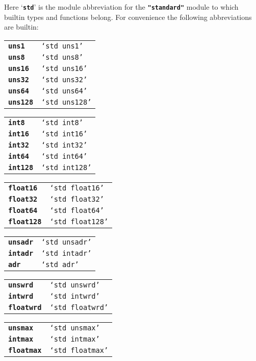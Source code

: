 \documentclass[12pt]{article}
\makeatletter
\newcommand{\TT}[1]{{\tt \bfseries #1}}
\newcommand{\ttkey}[1]{\TT{#1}\index{#1@{\tt #1}}}
\newcommand{\ABV}{-{}-{}->}		%
\newenvironment{indpar}[1][0.3in]%
	{\begin{list}{}%
		     {\setlength{\itemsep}{0in}%
		      \setlength{\topsep}{0in}%
		      \setlength{\parsep}{1ex}%
		      \setlength{\labelwidth}{#1}%
		      \setlength{\leftmargin}{#1}%
		      \addtolength{\leftmargin}{\labelsep}}%
	 \item}%
	{\end{list}}
\makeatother
\begin{document}
Here `\TT{std}' is the module abbreviation for the \TT{"standard"}
module to which builtin types and functions belong.  For convenience
the following abbreviations are builtin:
\begin{indpar}
\begin{tabular}{p{0.8in}@{\tt ~\ABV~}l}
\ttkey{uns1} & {\tt `std~uns1'} \\
\ttkey{uns8} & {\tt `std~uns8'} \\
\ttkey{uns16} & {\tt `std~uns16'} \\
\ttkey{uns32} & {\tt `std~uns32'} \\
\ttkey{uns64} & {\tt `std~uns64'} \\
\ttkey{uns128} & {\tt `std~uns128'} \\
\end{tabular}

\begin{tabular}{p{0.8in}@{\tt ~\ABV~}l}
\ttkey{int8} & {\tt `std~int8'} \\
\ttkey{int16} & {\tt `std~int16'} \\
\ttkey{int32} & {\tt `std~int32'} \\
\ttkey{int64} & {\tt `std~int64'} \\
\ttkey{int128} & {\tt `std~int128'} \\
\end{tabular}

\begin{tabular}{p{0.8in}@{\tt ~\ABV~}l}
\ttkey{float16} & {\tt `std~float16'} \\
\ttkey{float32} & {\tt `std~float32'} \\
\ttkey{float64} & {\tt `std~float64'} \\
\ttkey{float128} & {\tt `std~float128'} \\
\end{tabular}

\begin{tabular}{p{0.8in}@{\tt ~\ABV~}l}
\ttkey{unsadr} & {\tt `std~unsadr'} \\
\ttkey{intadr} & {\tt `std~intadr'} \\
\ttkey{adr} & {\tt `std~adr'} \\
\end{tabular}

\begin{tabular}{p{0.8in}@{\tt ~\ABV~}l}
\ttkey{unswrd} & {\tt `std~unswrd'} \\
\ttkey{intwrd} & {\tt `std~intwrd'} \\
\ttkey{floatwrd} & {\tt `std~floatwrd'} \\
\end{tabular}

\begin{tabular}{p{0.8in}@{\tt ~\ABV~}l}
\ttkey{unsmax} & {\tt `std~unsmax'} \\
\ttkey{intmax} & {\tt `std~intmax'} \\
\ttkey{floatmax} & {\tt `std~floatmax'} \\
\end{tabular}
\end{indpar}
\end{document}

